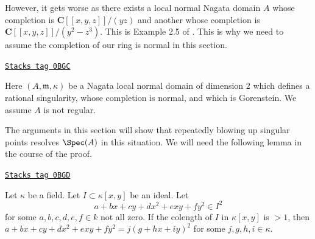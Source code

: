 \medskip\noindent
However, it gets worse as there exists a local normal Nagata domain $A$
whose completion is $\mathbf{C}[[x, y, z]]/(yz)$ and another whose
completion is $\mathbf{C}[[x, y, z]]/(y^2 - z^3)$. This is Example 2.5 of
\cite{Nishimura-few}. This is why we need to assume the completion of
our ring is normal in this section.

\begin{definition}
\label{resolve-situation-rational-double-point}
\href{https://stacks.math.columbia.edu/tag/0BGC}{\texttt{Stacks tag 0BGC}}

Here $(A, \mathfrak m, \kappa)$ be a Nagata local normal domain of
dimension $2$ which defines a rational singularity, whose completion
is normal, and which is Gorenstein. We assume $A$ is not regular.
\end{definition}

The arguments in this section will show that repeatedly blowing
up singular points resolves $\Spec(A)$ in this situation. We will
need the following lemma in the course of the proof.

\begin{lemma}[Issquare]
\label{resolve-lemma-issquare}
\href{https://stacks.math.columbia.edu/tag/0BGD}{\texttt{Stacks tag 0BGD}}

Let $\kappa$ be a field. Let $I \subset \kappa[x, y]$ be an ideal. Let
$$
a + b x + c y + d x^2 + exy + f y^2 \in I^2
$$
for some $a, b, c, d, e, f \in k$ not all zero. If the colength
of $I$ in $\kappa[x, y]$ is $> 1$, then
$a + b x + c y + d x^2 + exy + f y^2 = j(g + hx + iy)^2$
for some $j, g, h, i \in \kappa$.
\end{lemma}

